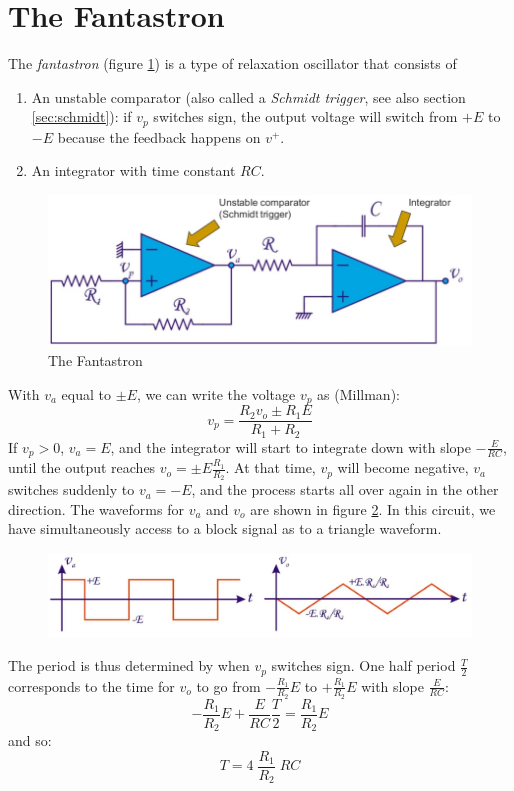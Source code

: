 \section{The Fantastron}
\label{ch:fantastron}

The \emph{fantastron} (figure \ref{fig:fantastron1}) is a type of relaxation oscillator that consists of
\begin{enumerate}
	\item An unstable comparator (also called a \emph{Schmidt trigger}, see also section \ref{sec:schmidt}): if $v_p$ switches sign, the output voltage will switch from $+E$ to $-E$ because the feedback happens on $v^+$.
	\item An integrator with time constant $RC$.
\end{enumerate}

\begin{figure}[h!]
	\centering
	\includegraphics[width=12cm]{figures/ch11/fantastron1.jpg}
	\caption{The Fantastron}
	\label{fig:fantastron1}
\end{figure}

With $v_a$ equal to $\pm E$, we can write the voltage $v_p$ as (Millman):
$$
v_p = \frac{R_2 v_o \pm R_1 E}{R_1 + R_2}
$$
If $v_p > 0$, $v_a = E$, and the integrator will start to integrate down with slope $-\frac{E}{RC}$, until the output reaches $v_o = \pm E \frac{R_1}{R_2}$. At that time, $v_p$ will become negative, $v_a$ switches suddenly to $v_a = -E$, and the process starts all over again in the other direction. The waveforms for $v_a$ and $v_o$ are shown in figure \ref{fig:fantastron2}. In this circuit, we have simultaneously access to a block signal as to a triangle waveform.

\begin{figure}[h!]
	\centering
	\includegraphics[width=14cm]{figures/ch11/fantastron2.jpg}
	\caption{}
	\label{fig:fantastron2}
\end{figure}
The period is thus determined by when $v_p$ switches sign. One half period $\frac{T}{2}$ corresponds to the time for $v_o$ to go from $-\frac{R_1}{R_2}E$ to $+\frac{R_1}{R_2}E$ with slope $\frac{E}{RC}$:
$$
- \frac{R_1}{R_2}E + \frac{E}{RC} \frac{T}{2} = \frac{R_1}{R_2} E
$$
and so:
$$
T = 4 \; \frac{R_1}{R_2}\;  RC
$$
